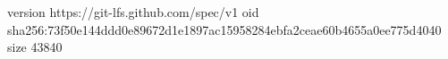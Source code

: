 version https://git-lfs.github.com/spec/v1
oid sha256:73f50e144ddd0e89672d1e1897ac15958284ebfa2ceae60b4655a0ee775d4040
size 43840
